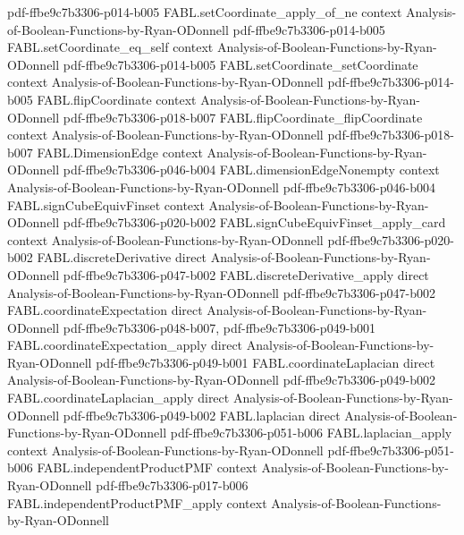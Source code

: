 \begin{theorem}
  {pdf-ffbe9c7b3306-p014-b005}
\proofstep
  {FABL.setCoordinate_apply_of_ne}
  {context}
  {Analysis-of-Boolean-Functions-by-Ryan-ODonnell}
  {pdf-ffbe9c7b3306-p014-b005}
\proofstep
  {FABL.setCoordinate_eq_self}
  {context}
  {Analysis-of-Boolean-Functions-by-Ryan-ODonnell}
  {pdf-ffbe9c7b3306-p014-b005}
\proofstep
  {FABL.setCoordinate_setCoordinate}
  {context}
  {Analysis-of-Boolean-Functions-by-Ryan-ODonnell}
  {pdf-ffbe9c7b3306-p014-b005}
\proofstep
  {FABL.flipCoordinate}
  {context}
  {Analysis-of-Boolean-Functions-by-Ryan-ODonnell}
  {pdf-ffbe9c7b3306-p018-b007}
\proofstep
  {FABL.flipCoordinate_flipCoordinate}
  {context}
  {Analysis-of-Boolean-Functions-by-Ryan-ODonnell}
  {pdf-ffbe9c7b3306-p018-b007}
\proofstep
  {FABL.DimensionEdge}
  {context}
  {Analysis-of-Boolean-Functions-by-Ryan-ODonnell}
  {pdf-ffbe9c7b3306-p046-b004}
\proofstep
  {FABL.dimensionEdgeNonempty}
  {context}
  {Analysis-of-Boolean-Functions-by-Ryan-ODonnell}
  {pdf-ffbe9c7b3306-p046-b004}
\proofstep
  {FABL.signCubeEquivFinset}
  {context}
  {Analysis-of-Boolean-Functions-by-Ryan-ODonnell}
  {pdf-ffbe9c7b3306-p020-b002}
\proofstep
  {FABL.signCubeEquivFinset_apply_card}
  {context}
  {Analysis-of-Boolean-Functions-by-Ryan-ODonnell}
  {pdf-ffbe9c7b3306-p020-b002}
\proofstep
  {FABL.discreteDerivative}
  {direct}
  {Analysis-of-Boolean-Functions-by-Ryan-ODonnell}
  {pdf-ffbe9c7b3306-p047-b002}
\proofstep
  {FABL.discreteDerivative_apply}
  {direct}
  {Analysis-of-Boolean-Functions-by-Ryan-ODonnell}
  {pdf-ffbe9c7b3306-p047-b002}
\proofstep
  {FABL.coordinateExpectation}
  {direct}
  {Analysis-of-Boolean-Functions-by-Ryan-ODonnell}
  {pdf-ffbe9c7b3306-p048-b007,
    pdf-ffbe9c7b3306-p049-b001}
\proofstep
  {FABL.coordinateExpectation_apply}
  {direct}
  {Analysis-of-Boolean-Functions-by-Ryan-ODonnell}
  {pdf-ffbe9c7b3306-p049-b001}
\proofstep
  {FABL.coordinateLaplacian}
  {direct}
  {Analysis-of-Boolean-Functions-by-Ryan-ODonnell}
  {pdf-ffbe9c7b3306-p049-b002}
\proofstep
  {FABL.coordinateLaplacian_apply}
  {direct}
  {Analysis-of-Boolean-Functions-by-Ryan-ODonnell}
  {pdf-ffbe9c7b3306-p049-b002}
\proofstep
  {FABL.laplacian}
  {direct}
  {Analysis-of-Boolean-Functions-by-Ryan-ODonnell}
  {pdf-ffbe9c7b3306-p051-b006}
\proofstep
  {FABL.laplacian_apply}
  {context}
  {Analysis-of-Boolean-Functions-by-Ryan-ODonnell}
  {pdf-ffbe9c7b3306-p051-b006}
\proofstep
  {FABL.independentProductPMF}
  {context}
  {Analysis-of-Boolean-Functions-by-Ryan-ODonnell}
  {pdf-ffbe9c7b3306-p017-b006}
\proofstep
  {FABL.independentProductPMF_apply}
  {context}
  {Analysis-of-Boolean-Functions-by-Ryan-ODonnell}

\end{theorem}
